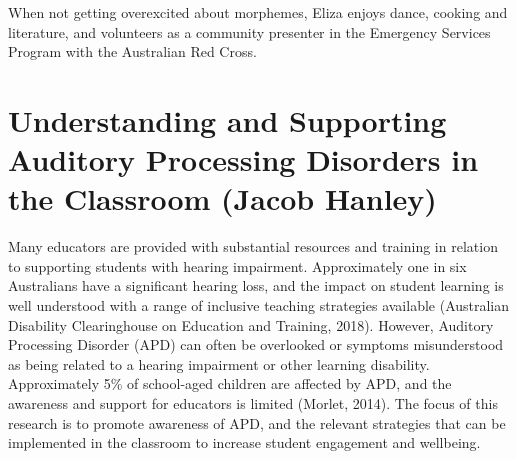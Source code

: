 \documentclass[twoside,12pt,a4paper,notitlepage]{memoir}
\begin{document}
When not getting overexcited about morphemes, Eliza enjoys dance, cooking and literature, and volunteers as a community presenter in the Emergency Services Program with the Australian Red Cross.



\pagebreak
\section*{Understanding and Supporting Auditory Processing Disorders in the Classroom (Jacob Hanley)}
\label{aut:hanley}

Many educators are provided with substantial resources and training in relation to supporting students with hearing impairment. Approximately one in six Australians have a significant hearing loss, and the impact on student learning is well understood with a range of inclusive teaching strategies available (Australian Disability Clearinghouse on Education and Training, 2018). However, Auditory Processing Disorder (APD) can often be overlooked or symptoms misunderstood as being related to a hearing impairment or other learning disability. Approximately 5\% of school-aged children are affected by APD, and the awareness and support for educators is limited (Morlet, 2014). The focus of this research is to promote awareness of APD, and the relevant strategies that can be implemented in the classroom to increase student engagement and wellbeing.
\end{document}
